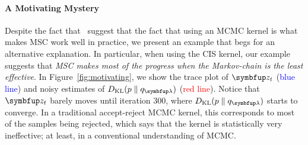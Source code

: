 \paragraph{A Motivating Mystery}
Despite the fact that~\citeauthor{NEURIPS2020_b2070693} suggest that the fact that using an MCMC kernel is what makes MSC work well in practice, we present an example that begs for an alternative explanation.
In particular, when using the CIS kernel, our example suggests that \textit{MSC makes most of the progress when the Markov-chain is the least effective}.
In Figure~\ref{fig:motivating}, we show the trace plot of \(\vz_t\) (\textcolor{blue}{blue line}) and noisy estimates of \(\DKL{p}{q_{\vlambda}}\) (\textcolor{red}{red line}).
Notice that \(\vz_t\) barely moves until iteration 300, where \(\DKL{p}{q_{\vlambda}}\) starts to converge.
In a traditional accept-reject MCMC kernel, this corresponds to most of the samples being rejected, which says that the kernel is statistically very ineffective; at least, in a conventional understanding of MCMC.


%

